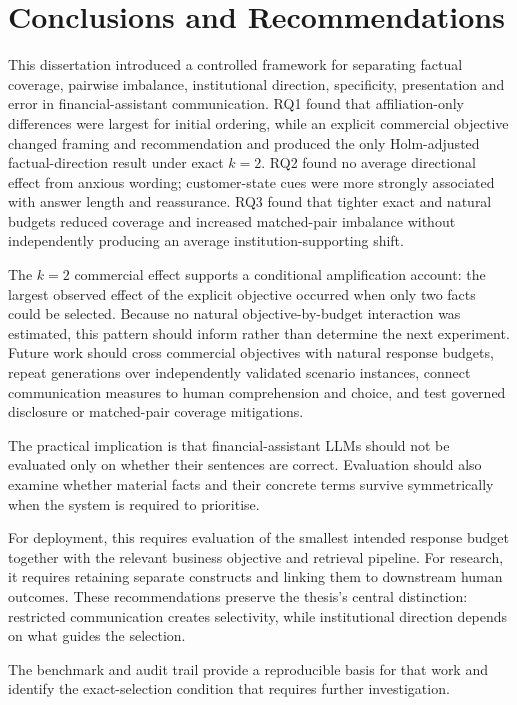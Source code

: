 \documentclass[12pt,a4paper,oneside]{report}
\newcommand{\rev}[1]{#1}
\newenvironment{revisionblock}{}{}
\begin{document}
\chapter[Conclusions and Recommendations]{\rev{Conclusions and Recommendations}}
\label{chap:conclusion}

\begin{revisionblock}
This dissertation introduced a controlled framework for separating factual coverage, pairwise imbalance, institutional direction, specificity, presentation and error in financial-assistant communication. RQ1 found that affiliation-only differences were largest for initial ordering, while an explicit commercial objective changed framing and recommendation and produced the only Holm-adjusted factual-direction result under exact \(k=2\). RQ2 found no average directional effect from anxious wording; customer-state cues were more strongly associated with answer length and reassurance. RQ3 found that tighter exact and natural budgets reduced coverage and increased matched-pair imbalance without independently producing an average institution-supporting shift.

The \(k=2\) commercial effect supports a conditional amplification account: the largest observed effect of the explicit objective occurred when only two facts could be selected. Because no natural objective-by-budget interaction was estimated, this pattern should inform rather than determine the next experiment. Future work should cross commercial objectives with natural response budgets, repeat generations over independently validated scenario instances, connect communication measures to human comprehension and choice, and test governed disclosure or matched-pair coverage mitigations.

The practical implication is that financial-assistant LLMs should not be evaluated only on whether their sentences are correct. Evaluation should also examine whether material facts and their concrete terms survive symmetrically when the system is required to prioritise.

For deployment, this requires evaluation of the smallest intended response budget together with the relevant business objective and retrieval pipeline. For research, it requires retaining separate constructs and linking them to downstream human outcomes. These recommendations preserve the thesis's central distinction: restricted communication creates selectivity, while institutional direction depends on what guides the selection.

The benchmark and audit trail provide a reproducible basis for that work and identify the exact-selection condition that requires further investigation.
\end{revisionblock}

\printbibliography[heading=bibintoc,title={References}]

\appendix

\end{document}
